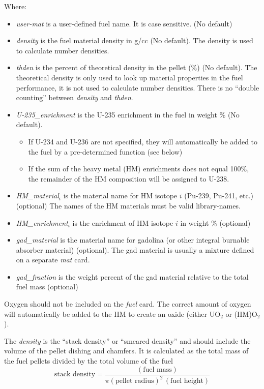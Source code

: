 Where:
\begin{itemize}   %
  \item {\it user-mat} is a user-defined fuel name. It is case sensitive. (No default)
  \item {\it density} is the fuel material density in g/cc (No default).
     The density is used to calculate number densities.
  \item {\it thden} is the percent of theoretical density in the pellet (\%) (No default).
   The theoretical density is only used to look up material properties in the fuel performance,
   it is not used to calculate number densities.  There is no ``double counting'' between
   {\it density} and {\it thden}.
  \item {\it U-235\_enrichment} is the U-235 enrichment in the fuel in weight \%  (No default).
  \begin{itemize}   %
    \item If U-234 and U-236 are not specified, they will automatically be added to the
       fuel by a pre-determined function (see below)
    \item If the sum of the heavy metal (HM) enrichments does not equal 100\%, the remainder of the
        HM composition will be assigned to U-238.
  \end{itemize}
  \item {\it HM\_material$_i$} is the material name for HM isotope $i$ (Pu-239, Pu-241, etc.) (optional)
    The names of the HM materials must be valid library-names.
  \item {\it HM\_enrichment$_i$} is the enrichment of HM isotope $i$ in weight \% (optional)
  \item {\it gad\_material} is the material name for gadolina (or other integral burnable absorber material) (optional).
        The gad material is usually a mixture defined on a separate {\it mat} card.
  \item {\it gad\_fraction} is the weight percent of the gad material relative to the total fuel mass (optional)
\end{itemize}

Oxygen should not be included on the {\it fuel} card.  The correct amount of oxygen will automatically
be added to the HM to create an oxide (either UO$_2$  or (HM)O$_2$).

The {\it density} is the ``stack density'' or ``smeared density'' and should include the volume
of the pellet dishing and chamfers.
It is calculated as the total mass of the fuel pellets divided by the total volume of the fuel
\begin{equation}
  \mbox{stack density} = \frac{ (\mbox{fuel mass})} { \pi (\mbox{pellet radius})^2 \, (\mbox{fuel height}) }
\end{equation}

